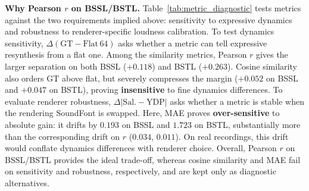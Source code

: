 \documentclass{article}
\begin{document}
\textbf{Why Pearson $r$ on BSSL/BSTL.}
Table~\ref{tab:metric_diagnostic} tests metrics against the two requirements implied above: sensitivity to expressive dynamics and robustness to renderer-specific loudness calibration. To test dynamics sensitivity, $\Delta(\mathrm{GT}-\mathrm{Flat\,64})$ asks whether a metric can tell expressive resynthesis from a flat one. Among the similarity metrics, Pearson $r$ gives the larger separation on both BSSL ($+0.118$) and BSTL ($+0.263$). Cosine similarity also orders GT above flat, but severely compresses the margin ($+0.052$ on BSSL and $+0.047$ on BSTL), proving \textbf{insensitive} to fine dynamics differences. To evaluate renderer robustness, $\Delta\lvert\mathrm{Sal.}-\mathrm{YDP}\rvert$ asks whether a metric is stable when the rendering SoundFont is swapped. Here, MAE proves \textbf{over-sensitive} to absolute gain: it drifts by $0.193$ on BSSL and $1.723$ on BSTL, substantially more than the corresponding drift on $r$ ($0.034$, $0.011$). On real recordings, this drift would conflate dynamics differences with renderer choice. Overall, Pearson $r$ on BSSL/BSTL provides the ideal trade-off, whereas cosine similarity and MAE fail on sensitivity and robustness, respectively, and are kept only as diagnostic alternatives.
\end{document}
